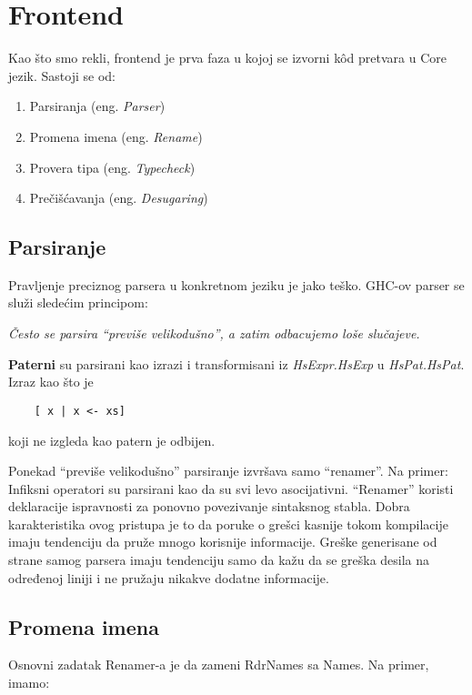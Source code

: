\section{Frontend}
\label{sec:frontend}

Kao što smo rekli, frontend je prva faza u kojoj se izvorni k\^{o}d pretvara u Core jezik. Sastoji se od:
	 \begin{enumerate}
	 	\item Parsiranja (eng. \emph{Parser})
	 	\item Promena imena (eng. \emph{Rename}) 
	 	\item Provera tipa (eng. \emph{Typecheck})
	 	\item Prečišćavanja (eng. \emph{Desugaring})
	 \end{enumerate} 


\subsection{Parsiranje}
\label{subsec:podnaslovParse}

Pravljenje preciznog parsera u konkretnom jeziku je jako teško. GHC-ov parser se služi sledećim principom: 

\textit{Često se parsira “previše velikodušno”,  a zatim odbacujemo loše slučajeve.}

\textbf{Paterni} su parsirani kao izrazi i transformisani iz 
\textit{HsExpr.HsExp} u\textit{ HsPat.HsPat}. Izraz kao što je
\begin{verbatim}
	[ x | x <- xs]
\end{verbatim}  
koji ne izgleda kao patern je odbijen.

Ponekad “previše velikodušno” parsiranje izvršava samo “renamer”. Na primer:
Infiksni operatori  su parsirani kao da su svi levo asocijativni. “Renamer” koristi deklaracije ispravnosti za ponovno povezivanje sintaksnog stabla. Dobra karakteristika ovog pristupa je to da poruke o grešci kasnije  tokom kompilacije imaju tendenciju da pruže mnogo korisnije informacije. Greške generisane od strane samog parsera imaju tendenciju samo da kažu da se greška desila na određenoj liniji i ne pružaju nikakve dodatne informacije.

\subsection{Promena imena}
\label{subsec:podnaslovRename}

Osnovni zadatak Renamer-a je da zameni RdrNames sa Names. Na primer, imamo:

